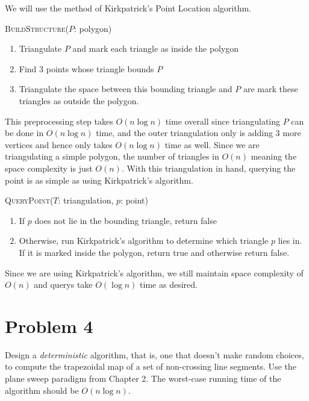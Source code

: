 \documentclass[12pt]{extarticle}
\begin{document}
\begin{solution}
    We will use the method of Kirkpatrick's Point Location algorithm.
    \begin{algorithm}[H]
        \caption{\textsc{BuildStructure}($P$: polygon)}
        \begin{enumerate}
            \item Triangulate $P$ and mark each triangle as inside the polygon
            \item Find 3 points whose triangle bounds $P$
            \item Triangulate the space between this bounding triangle and $P$ are mark these triangles as outside the polygon.
        \end{enumerate}
    \end{algorithm}

    This preprocessing step takes $O(n \log n)$ time overall since triangulating $P$ can be done in $O(n \log n)$ time, and the outer triangulation only is adding 3 more vertices and hence only takes $O(n \log n)$ time as well. Since we are triangulating a simple polygon, the number of triangles in $O(n)$ meaning the space complexity is just $O(n)$. With this triangulation in hand, querying the point is as simple as using Kirkpatrick's algorithm.
    \begin{algorithm}[H]
        \caption{\textsc{QueryPoint}($T$: triangulation, $p$: point)}
        \begin{enumerate}
            \item If $p$ does not lie in the bounding triangle, return false
            \item Otherwise, run Kirkpatrick's algorithm to determine which triangle $p$ lies in. If it is marked inside the polygon, return true and otherwise return false.
        \end{enumerate}
    \end{algorithm}
    Since we are using Kirkpatrick's algorithm, we still maintain space complexity of $O(n)$ and querys take $O(\log n)$ time as desired.
\end{solution}

\section*{Problem 4}
Design a \textit{deterministic} algorithm, that is, one that doesn't make random choices, to compute the trapezoidal map of a set of non-crossing line segments. Use the plane sweep paradigm from Chapter 2. The worst-case running time of the algorithm should be $O(n\log n)$.
\end{document}
